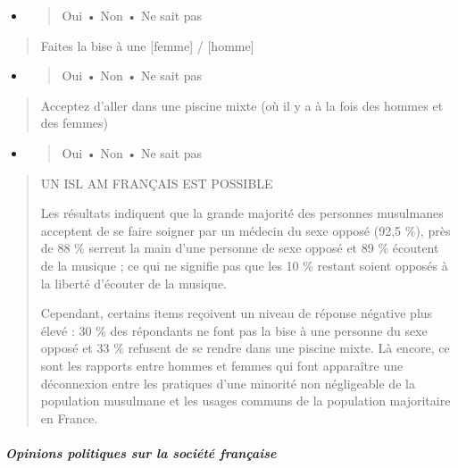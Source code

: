 \begin{itemize}
\item
  \begin{quote}
  Oui • Non • Ne sait pas
  \end{quote}
\end{itemize}

\begin{quote}
Faites la bise à une {[}femme{]} / {[}homme{]}
\end{quote}

\begin{itemize}
\item
  \begin{quote}
  Oui • Non • Ne sait pas
  \end{quote}
\end{itemize}

\begin{quote}
Acceptez d'aller dans une piscine mixte (où il y a à la fois des hommes
et des femmes)
\end{quote}

\begin{itemize}
\item
  \begin{quote}
  Oui • Non • Ne sait pas
  \end{quote}
\end{itemize}

\begin{quote}
UN ISL AM FRANÇAIS EST POSSIBLE

Les résultats indiquent que la grande majorité des personnes musulmanes
acceptent de se faire soigner par un médecin du sexe opposé (92,5 \%),
près de 88 \% serrent la main d'une personne de sexe opposé et 89 \%
écoutent de la musique ; ce qui ne signifie pas que les 10 \% restant
soient opposés à la liberté d'écouter de la musique.

Cependant, certains items reçoivent un niveau de réponse négative plus
élevé : 30 \% des répondants ne font pas la bise à une personne du sexe
opposé et 33 \% refusent de se rendre dans une piscine mixte. Là encore,
ce sont les rapports entre hommes et femmes qui font apparaître une
déconnexion entre les pratiques d'une minorité non négligeable de la
population musulmane et les usages communs de la population majoritaire
en France.
\end{quote}

\hypertarget{opinions-politiques-sur-la-sociuxe9tuxe9-franuxe7aise}{%
\subparagraph{Opinions politiques sur la société
française}\label{opinions-politiques-sur-la-sociuxe9tuxe9-franuxe7aise}}

